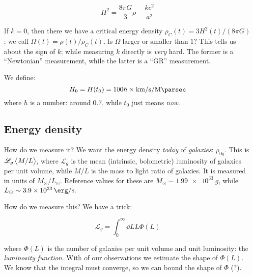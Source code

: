 \documentclass[main.tex]{subfiles}
\begin{document}
\begin{equation}
  H^2 = \frac{8 \pi G}{3} \rho - \frac{kc^2}{a^2}
\end{equation}

If \(k=0\), then there we have a critical energy density \(\rho_C (t) = 3 H^2 (t) / (8 \pi G)\): we call \(\Omega(t) = \rho(t) / \rho_C(t)\).
Is \(\Omega\) larger or smaller than 1? This tells us about the sign of \(k\); while measuring \(k\) directly is \emph{very} hard. The former is a ``Newtonian'' measurement, while the latter is a ``GR'' measurement.

We define:
\begin{equation}
  H_0 = H(t_0) = 100 h \times \SI{}{\kilo\metre\per\second\per\mega\parsec}
\end{equation}
%
where \(h\) is a number: around \(0.7\), while  \(t_0\) just means \emph{now}.

\subsection{Energy density}

How do we measure it? We want the energy density \emph{today} of \emph{galaxies}: \(\rho_{0g}\).
This is \(\mathscr L_g \expval{M/L} \), where \(\mathscr L _g\) is the mean (intrinsic, bolometric) luminosity of galaxies per unit volume, while \(M/L\) is the mass to light ratio of galaxies.
It is measured in units of \(M_{\odot} / L_{\odot}\). Reference values for these are \(M_{\odot} \sim \SI{1.99e33}{g}\), while \(L_\odot \sim \SI{3.9e33}{\erg\per\second} \).

How do we measure this? We have a trick:

\begin{equation}
  \mathscr L _g = \int_0^\infty \dd{L} L \Phi(L)
\end{equation}

where \(\Phi(L)\) is the number of galaxies per unit volume and unit luminosity: the \emph{luminosity function}. With of our observations we estimate the shape of \(\Phi(L)\). We know that the integral must converge, so we can bound the shape of \(\Phi\) (?).
\end{document}
